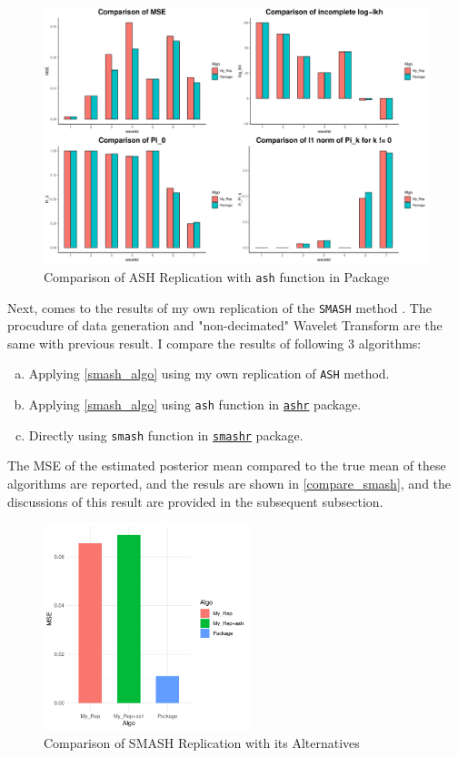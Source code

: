 \documentclass[11pt]{article}
\begin{document}
\begin{figure}[!htb]
\includegraphics[width=13cm]{./plot/compare_ash.pdf}
\centering
\caption{Comparison of ASH Replication with \texttt{ash} function in Package}
\label{compare_ash}
\end{figure}

Next, comes to the results of my own replication of the \verb|SMASH| method \cite{Xing}. The procudure of data generation and "non-decimated" Wavelet Transform are the same with previous result. I compare the results of following 3 algorithms:
\begin{enumerate}[a)]
\item Applying \autoref{smash_algo} using my own replication of \verb|ASH| method.
\item Applying \autoref{smash_algo} using \verb|ash| function in \href{https://cran.r-project.org/web/packages/ashr/ashr.pdf}{\texttt{ashr}} package.
\item Directly using \verb|smash| function in \href{https://github.com/stephenslab/smashr}{\texttt{smashr}} package.
\end{enumerate} 

The MSE of the estimated posterior mean compared to the true mean of these algorithms are reported, and the resuls are shown in \autoref{compare_smash}, and the discussions of this result are provided in the subsequent subsection.

\begin{figure}[!htb]
\includegraphics[width=6cm]{./plot/compare_smash.pdf}
\centering
\caption{Comparison of SMASH Replication with its Alternatives}
\label{compare_smash}
\end{figure}
\end{document}
